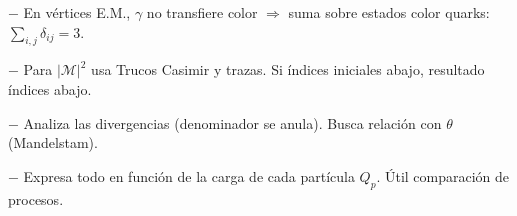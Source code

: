 $- $ En vértices E.M., $\gamma$ no transfiere color $\Rightarrow$ suma sobre estados color quarks: $\sum_{i,j} \delta_{ij} = 3$.

$- $ Para $|\mathcal{M}|^2$ usa Trucos Casimir y trazas. Si índices iniciales abajo, resultado índices abajo.

$- $ Analiza las divergencias (denominador se anula). Busca relación con $\theta$ (Mandelstam).

$ - $ Expresa todo en función de la carga de cada partícula $Q_p$. Útil comparación de procesos.


\newcolumn






